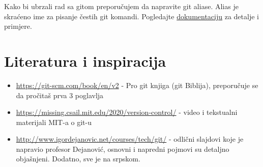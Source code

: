 \documentclass[11pt,a4paper]{article}
\begin{document}
Kako bi ubrzali rad sa gitom preporučujem da napravite git aliase. Alias
je skraćeno ime za pisanje čestih git komandi. Pogledajte
\href{https://git-scm.com/book/en/v2/Git-Basics-Git-Aliases}{dokumentaciju}
za detalje i primjere.

\section{Literatura i inspiracija}

\begin{itemize}
\item
  \url{https://git-scm.com/book/en/v2} - Pro git knjiga (git Biblija),
  preporučuje se da pročitaš prva 3 poglavlja
\item
  \url{https://missing.csail.mit.edu/2020/version-control/} - video i
  tekstualni materijali MIT-a o git-u
\item
  \url{http://www.igordejanovic.net/courses/tech/git/} - odlični
  slajdovi koje je napravio profesor Dejanović, osnovni i napredni
  pojmovi su detaljno objašnjeni. Dodatno, sve je na srpskom.
\end{itemize}
\end{document}
